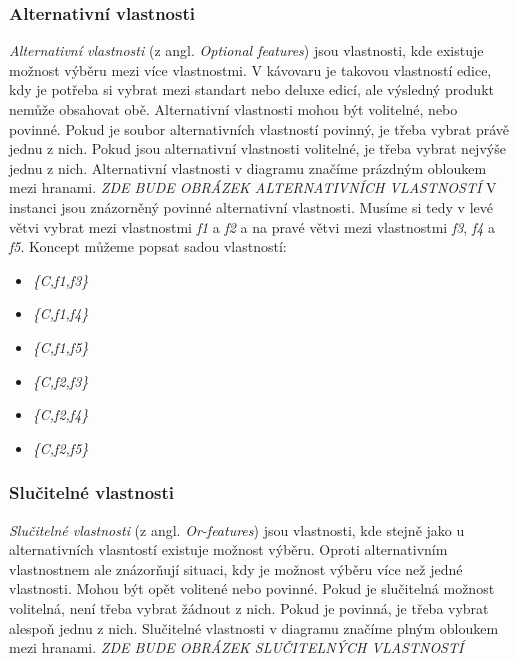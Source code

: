 \subsubsection{Alternativní vlastnosti}
\textit{Alternativní vlastnosti} (z angl. \textit{Optional features}) jsou vlastnosti, kde existuje možnost výběru mezi více vlastnostmi. V kávovaru je takovou vlastností edice, kdy je potřeba si vybrat mezi standart nebo deluxe edicí, ale výsledný produkt nemůže obsahovat obě. Alternativní vlastnosti mohou být volitelné, nebo povinné. Pokud je soubor alternativních vlastností povinný, je třeba vybrat právě jednu z nich. Pokud jsou alternativní vlastnosti volitelné, je třeba vybrat nejvýše jednu z nich.
Alternativní vlastnosti v diagramu značíme prázdným obloukem mezi hranami.
\newline
\newline
\textit{ZDE BUDE OBRÁZEK ALTERNATIVNÍCH VLASTNOSTÍ}
\newline
\newline
V instanci jsou znázorněný povinné alternativní vlastnosti. Musíme si tedy v levé větvi vybrat mezi vlastnostmi \textit{f1} a \textit{f2} a na pravé větvi mezi vlastnostmi \textit{f3}, \textit{f4} a \textit{f5}. Koncept můžeme popsat sadou vlastností:
\begin{itemize}
	\item \textit{\{C,f1,f3\}}
	\item \textit{\{C,f1,f4\}}
	\item \textit{\{C,f1,f5\}}
	\item \textit{\{C,f2,f3\}}
	\item \textit{\{C,f2,f4\}}
	\item \textit{\{C,f2,f5\}}
\end{itemize}

\subsubsection{Slučitelné vlastnosti}
\textit{Slučitelné vlastnosti} (z angl. \textit{Or-features}) jsou vlastnosti, kde stejně jako u alternativních vlasntostí existuje možnost výběru. Oproti alternativním vlastnostnem ale znázorňují situaci, kdy je možnost výběru více než jedné vlastnosti. Mohou být opět volitené nebo povinné. Pokud je slučitelná možnost volitelná, není třeba vybrat žádnout z nich. Pokud je povinná, je třeba vybrat alespoň jednu z nich. 
Slučitelné vlastnosti v diagramu značíme plným obloukem mezi hranami.
\newline
\newline
\textit{ZDE BUDE OBRÁZEK SLUČITELNÝCH VLASTNOSTÍ}
\newline
\newline

